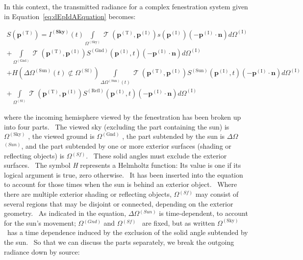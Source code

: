 In this context, the transmitted radiance for a complex fenestration system given in Equation~\ref{eq:dEpIdAEquation} becomes:

\begin{equation}
\begin{array}{c}S({{\mathbf{p}}^{{\mathrm{(T)}}}}) = {I^{({\mathbf{Sky}})}}(t)\int\limits_{{\Omega ^{{\mathrm{(Sky)}}}}} {\operatorname{\mathcal{T}} ({{\mathbf{p}}^{{\mathrm{(T)}}}},{{\mathbf{p}}^{{\mathrm{(I)}}}})s({{\mathbf{p}}^{{\mathrm{(I)}}}})\left( { - {{\mathbf{p}}^{{\mathrm{(I)}}}}\cdot {\mathbf{n}}} \right)d{\Omega ^{{\mathrm{(I)}}}}} \\ + \int\limits_{{\Omega ^{{\mathrm{(Gnd)}}}}} {\operatorname{\mathcal{T}} ({{\mathbf{p}}^{{\mathrm{(T)}}}},{{\mathbf{p}}^{{\mathrm{(I)}}}}){S^{{\mathrm{(Gnd)}}}}({{\mathbf{p}}^{{\mathrm{(I)}}}},t)\left( { - {{\mathbf{p}}^{{\mathrm{(I)}}}}\cdot {\mathbf{n}}} \right)d{\Omega ^{{\mathrm{(I)}}}}} \\ + H\left( {\Delta {\Omega ^{{\mathrm{(Sun)}}}}(t) \not\subset {\Omega ^{{\mathrm{(Sf)}}}}} \right)\int\limits_{\Delta {\Omega ^{{\mathrm{(Sun)}}}}(t)} {\operatorname{\mathcal{T}} ({{\mathbf{p}}^{{\mathrm{(T)}}}},{{\mathbf{p}}^{{\mathrm{(I)}}}}){S^{{\mathrm{(Sun)}}}}({{\mathbf{p}}^{{\mathrm{(I)}}}},t)\left( { - {{\mathbf{p}}^{{\mathrm{(I)}}}}\cdot {\mathbf{n}}} \right)d{\Omega ^{{\mathrm{(I)}}}}} \\ + \int\limits_{{\Omega ^{{\mathrm{(Sf)}}}}} {\operatorname{\mathcal{T}} ({{\mathbf{p}}^{{\mathrm{(T)}}}},{{\mathbf{p}}^{{\mathrm{(I)}}}}){S^{{\mathrm{(Refl)}}}}({{\mathbf{p}}^{{\mathrm{(I)}}}},t)\left( { - {{\mathbf{p}}^{{\mathrm{(I)}}}}\cdot {\mathbf{n}}} \right)d{\Omega ^{{\mathrm{(I)}}}}} \end{array}
\end{equation}

where the incoming hemisphere viewed by the fenestration has been broken up into four parts.~ The viewed sky (excluding the part containing the sun) is \({\Omega ^{{\mathrm{(Sky)}}}}\) , the viewed ground is \({\Omega ^{{\mathrm{(Gnd)}}}}\) , the part subtended by the sun is \(\Delta\Omega\)\(^{(Sun)}\), and the part subtended by one or more exterior surfaces (shading or reflecting objects) is \(\Omega\)\(^{(Sf)}\).~ These solid angles must exclude the exterior surfaces.~ The symbol \emph{H} represents a Helmholtz function: Its value is one if its logical argument is true, zero otherwise.~ It has been inserted into the equation to account for those times when the sun is behind an exterior object.~ Where there are multiple exterior shading or reflecting objects, \(\Omega\)\(^{(Sf)}\) may consist of several regions that may be disjoint or connected, depending on the exterior geometry.~ As indicated in the equation, \(\Delta\Omega\)\(^{(Sun)}\) is time-dependent, to account for the sun's movement; \(\Omega\)\(^{(Gnd)}\) and \(\Omega\)\(^{(Sf)}\)~ are fixed, but as written \({\Omega ^{{\mathrm{(Sky)}}}}\) ~has a time dependence induced by the exclusion of the solid angle subtended by the sun.~ So that we can discuss the parts separately, we break the outgoing radiance down by source:

